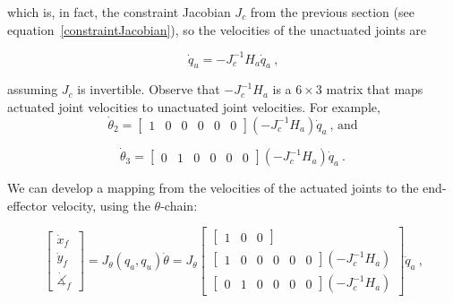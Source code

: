 \documentclass{report}
\begin{document}
which is, in fact, the constraint Jacobian $J_{c}$ from the previous section (see equation~\ref{constraintJacobian}), so the velocities of the unactuated joints are

\begin{equation} \label{unactuatedJointVelocities}
\dot{q}_{u} = -J_{c}^{-1}H_{a}\dot{q}_{a}\ \text{,}
\end{equation}

assuming $J_{c}$ is invertible. Observe that $-J_{c}^{-1}H_{a}$ is a $6\times 3$ matrix that maps actuated joint velocities to unactuated joint velocities. For example, 
\begin{equation} \label{theta2dotFromqDotA}
\dot{\theta}_{2} = \begin{bmatrix}
1 & 0 & 0 & 0 & 0 & 0
\end{bmatrix}\left(-J_{c}^{-1}H_{a}\right)\dot{q}_{a}\ \text{, and}
\end{equation}

\begin{equation} \label{theta3dotFromqDotA}
\dot{\theta}_{3} = \begin{bmatrix}
0 & 1 & 0 & 0 & 0 & 0
\end{bmatrix}\left(-J_{c}^{-1}H_{a}\right)\dot{q}_{a}\ \text{.}
\end{equation}

We can develop a mapping from the velocities of the actuated joints to the end-effector velocity, using the $\theta$-chain:

\begin{equation}
\begin{bmatrix}
\dot{x}_{f}\\
\dot{y}_{f}\\
\dot{\measuredangle}_{f}
\end{bmatrix} = 
J_{\theta}\left(q_{a},q_{u}\right)\dot{\theta} = J_{\theta}
\begin{bmatrix}
\begin{bmatrix}1 & 0 & 0 \end{bmatrix}\\
\begin{bmatrix}
1 & 0 & 0 & 0 & 0 & 0
\end{bmatrix}\left(-J_{c}^{-1}H_{a}\right)\\
\begin{bmatrix}
0 & 1 & 0 & 0 & 0 & 0
\end{bmatrix}\left(-J_{c}^{-1}H_{a}\right)
\end{bmatrix}\dot{q}_{a}\ \text{,}
\end{equation}
\end{document}
